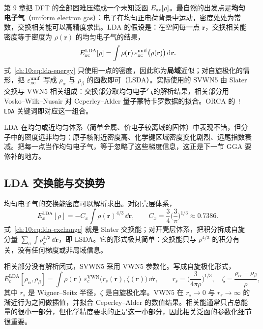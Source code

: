 第 9 章把 DFT 的全部困难压缩成一个未知泛函 $E_{\mathrm{xc}}[\rho]$。最自然的出发点是\textbf{均匀电子气}（uniform electron gas）：电子在均匀正电荷背景中运动，密度处处为常数，交换相关能可以高精度求出。LDA 的假设是：在空间每一点 $\mathbf r$，交换相关能密度等于密度为 $\rho(\mathbf r)$ 的均匀电子气的结果，
\begin{equation}
E_{\mathrm{xc}}^{\mathrm{LDA}}[\rho]
= \int \rho(\mathbf r)\,\varepsilon_{\mathrm{xc}}^{\mathrm{unif}}\big(\rho(\mathbf r)\big)\,\mathrm{d}\mathbf r .
\label{ch:10:eq:lda-energy}
\end{equation}
式~\eqref{ch:10:eq:lda-energy} 只使用一点的密度，因此称为\textbf{局域}近似；对自旋极化的情形，把 $\varepsilon_{\mathrm{xc}}^{\mathrm{unif}}$ 写成 $\rho_\alpha$ 与 $\rho_\beta$ 的函数即可（LSDA）。实际使用的 SVWN5 由 Slater 交换与 VWN5 相关组成：交换部分取均匀电子气的解析结果，相关部分用 Vosko--Wilk--Nusair 对 Ceperley--Alder 量子蒙特卡罗数据的拟合\citep{vosko1980,ceperley1980,perdew1981sie}。ORCA 的 \texttt{! LDA} 关键词即对应这一组合。

LDA 在均匀或近均匀体系（简单金属、价电子较离域的固体）中表现不错，但分子中的密度远非均匀：原子核附近密度高、化学键区域密度变化剧烈、远尾指数衰减。把每一点当作均匀电子气，等于忽略了这些梯度信息，这正是下一节 GGA 要修补的地方。

\subsection{LDA 交换能与交换势}
\label{ch:10:sec:lda-exchange}

均匀电子气的交换能密度可以解析求出。对闭壳层体系，
\begin{equation}
E_x^{\mathrm{LDA}}[\rho]
= -C_x\int \rho(\mathbf r)^{4/3}\,\dd\mathbf r,
\qquad
C_x=\frac{3}{4}\Big(\frac{3}{\pi}\Big)^{1/3}\approx 0.7386 .
\label{ch:10:eq:lda-exchange}
\end{equation}
式~\eqref{ch:10:eq:lda-exchange} 就是 Slater 交换能；对开壳层体系，把积分拆成自旋分量 $\sum_\sigma\int\rho_\sigma^{4/3}\,\dd\mathbf r$，即 LSDA。它的形式极其简单：交换能只与 $\rho^{4/3}$ 的积分有关，没有任何梯度或非局域信息。

相关部分没有解析闭式，SVWN5 采用 VWN5 参数化。写成自旋极化形式，
\begin{equation}
E_c^{\mathrm{LDA}}[\rho_\alpha,\rho_\beta]
= \int \rho(\mathbf r)\,\varepsilon_c^{\mathrm{VWN}}\big(r_s(\mathbf r),\zeta(\mathbf r)\big)\,\dd\mathbf r,
\qquad
r_s=\Big(\frac{3}{4\pi\rho}\Big)^{1/3},
\quad
\zeta=\frac{\rho_\alpha-\rho_\beta}{\rho},
\label{ch:10:eq:lda-correlation}
\end{equation}
其中 $r_s$ 是 Wigner--Seitz 半径，$\zeta$ 是自旋极化率。VWN5 在 $r_s\to 0$ 与 $r_s\to\infty$ 的渐近行为之间做插值，并拟合 Ceperley--Alder 的数值结果\citep{vosko1980,ceperley1980}。相关能通常只占总能量的很小一部分，但化学精度要求的正是这一小部分，因此相关泛函的参数化细节很重要。

